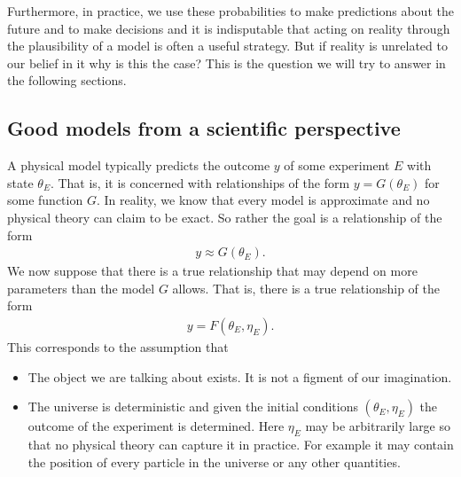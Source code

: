 \documentclass[
    a4paper,
    DIV=14,
    abstract=true,
    numbers=noenddot
]
{scrartcl}
\theoremstyle{definition}
\begin{document}
Furthermore, in practice, we use these probabilities to make predictions about the future and to make decisions and it is indisputable that acting on reality through the plausibility of a model is often a useful strategy. But if reality is unrelated to our belief in it why is this the case? This is the question we will try to answer in the following sections.
\subsection{Good models from a scientific perspective}
A physical model typically predicts the outcome $y$ of some experiment $E$ with state $\theta _E$. That is, it is concerned with relationships of the form $y=G(\theta _E)$ for some function $G$. In reality, we know that every model is approximate and no physical theory can claim to be exact. So rather the goal is a relationship of the form
\begin{align*}
    y\approx G(\theta _E).
\end{align*}
We now suppose that there is a true relationship that may depend on more parameters than the model $G$ allows. That is, there is a true relationship of the form
\begin{align*}
    y= F(\theta _E, \eta_E).
\end{align*}
This corresponds to the assumption that
\begin{itemize}
    \item The object we are talking about exists. It is not a figment of our imagination.
    \item The universe is deterministic and given the initial conditions $(\theta _E, \eta_E)$ the outcome of the experiment is determined. Here $\eta _E$ may be arbitrarily large so that no physical theory can capture it in practice. For example it may contain the position of every particle in the universe or any other quantities.
\end{itemize}
\end{document}

